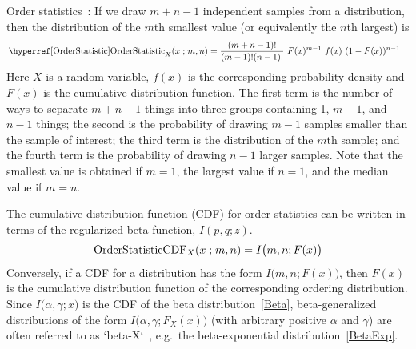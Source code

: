 

\clearpage
{}


\label{OrderStatistic}
Order statistics~\cite{David2005}: If we draw $m+n-1$ independent samples from a distribution, then the distribution of the $m$th smallest value (or equivalently the $n$th largest) is
\begin{align*}
&\opr{OrderStatistic}_{X}(x \given m, n)  
= \frac{(m+n-1)!}{(m-1)!(n-1)!} \ F(x)^{m-1}\ f(x)\ (1- F(x))^{n-1}
\checked
\end{align*}
Here $X$ is a random variable, $f(x)$ is the corresponding probability density and $F(x)$ is the cumulative distribution function. The first term is the number of ways to separate $m+n-1$ things into three groups containing 1, $m-1$, and $n-1$ things; the second is the probability of drawing $m-1$ samples smaller than the sample of interest; the third term is the distribution of the $m$th sample; and the fourth term is the probability of drawing $n-1$ larger samples. Note that the smallest value is obtained if $m=1$, the largest value if $n=1$, and the median value if $m=n$.

The cumulative distribution function (CDF) for order statistics can be written in terms of the regularized beta function, $I(p,q;z)$.
\begin{align*}
\op{OrderStatisticCDF}_{X}(x \given m, n)  = I\bigl(m,n; F(x) \bigr)
\checked
\end{align*}
Conversely, if a CDF for a distribution has the form $I\bigl(m,n; F(x) \bigr)$, then $F(x)$ is the cumulative distribution function of the corresponding ordering distribution. Since $I\bigl(\alpha,\gamma;x \bigr)$ is the CDF of the beta distribution~\eqref{Beta}, beta-generalized distributions of the form $I\bigl(\alpha,\gamma; F_X(x) \bigr)$ (with arbitrary positive $\alpha$ and $\gamma$) are often referred to as `beta-X`~\cite{Eugene2002}, e.g.\ the beta-exponential distribution~\eqref{BetaExp}.


